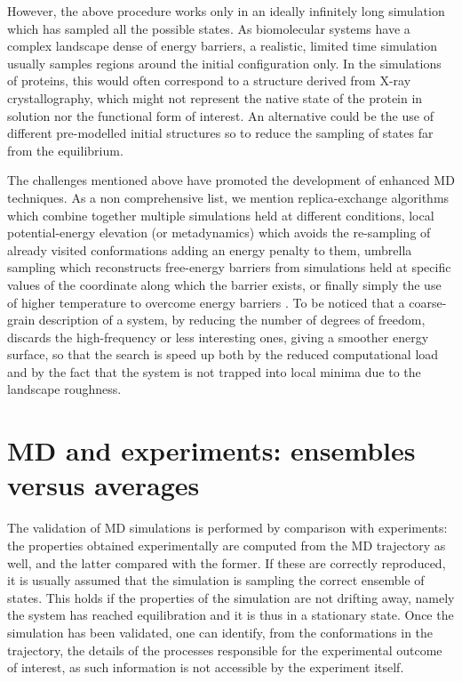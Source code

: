 However, the above procedure works only in an ideally infinitely long simulation which has sampled all the possible states. As biomolecular systems have a complex landscape dense of energy barriers, a realistic, limited time simulation usually samples regions around the initial configuration only.
%
In the simulations of proteins, this would often correspond to a structure derived from X-ray crystallography, which might not represent the native state of the protein in solution nor the functional form of interest.
%
An alternative could be the use of different pre-modelled initial structures so to reduce the sampling of states far from the equilibrium.

The challenges mentioned above have promoted the development of enhanced MD techniques. As a non comprehensive list, we mention replica-exchange algorithms \cite{Okamoto2004} which combine together multiple simulations held at different conditions, local potential-energy elevation (or metadynamics) \cite{Huber1994,Laio2002} which avoids the re-sampling of already visited conformations adding an energy penalty to them, umbrella sampling \cite{Torrie1977} which reconstructs free-energy barriers from simulations held at specific values of the coordinate along which the barrier exists, or finally simply the use of higher temperature to overcome energy barriers \cite{Kirkpatrick1983}.
%
To be noticed that a coarse-grain description of a system, by reducing the number of degrees of freedom, discards the high-frequency or less interesting ones, giving a smoother energy surface, so that the search is speed up both by the reduced computational load and by the fact that the system is not trapped into local minima due to the landscape roughness.


\section{MD and experiments: ensembles versus averages}
The validation of MD simulations is performed by comparison with experiments: the properties obtained experimentally are computed from the MD trajectory as well, and the latter compared with the former. If these are correctly reproduced, it is usually assumed that the simulation is sampling the correct ensemble of states. This holds if the properties of the simulation are not drifting away, namely the system has reached equilibration and it is thus in a stationary state.
%
Once the simulation has been validated, one can identify, from the conformations in the trajectory, the details of the processes responsible for the experimental outcome of interest, as such information is not accessible by the experiment itself.

